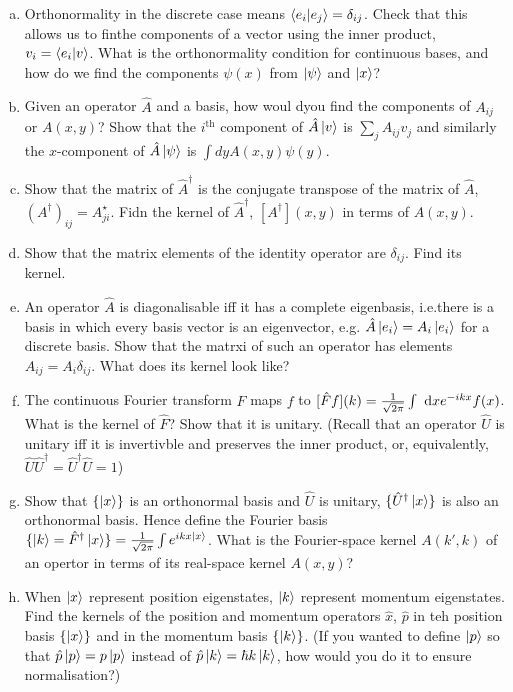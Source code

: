 \documentclass[10pt]{article}
\begin{document}
    \begin{enumerate}[(a)]
        \item Orthonormality in the discrete case means $\braket{e_i}{e_j} = \delta_{ij}$. Check that this allows us to finthe components of a vector using the inner product, $v_i = \braket{e_i}{v}$. What is the orthonormality condition for continuous bases, and how do we find the components $\psi(x)$ from $\ket \psi$ and $\ket x$?
        \item Given an operator $\hat A$ and a basis, how woul dyou find the components of $A_{ij}$ or $A(x, y)$? Show that the $i^{\text{th}}$ component of $\hat A \ket v$ is $\sum_j A_{ij}v_j$ and similarly the $x$-component of $\hat A \ket\psi$ is $\int dy A(x, y) \psi(y)$.
        \item Show that the matrix of $\hat A^\dagger$ is the conjugate transpose of the matrix of $\hat A$, $(A^\dagger)_{ij} = A^\star_{ji}$. Fidn the kernel of $\hat A^\dagger$, $[A^\dagger](x, y)$ in terms of $A(x, y)$.
        \item Show that the matrix elements of the identity operator are $\delta_{ij}$. Find its kernel.
        \item An operator $\hat A$ is diagonalisable iff it has a complete eigenbasis, i.e.there is a basis in which every basis vector is an eigenvector, e.g. $\hat A \ket{e_i} = A_i \ket{e_i}$ for a discrete basis. Show that the matrxi of such an operator has elements $A_{ij} = A_i\delta_{ij}$. What does its kernel look like? 
        \item The continuous Fourier transform $\hat F$ maps $f$ to $[\hat F f](k) = \frac{1}{\sqrt{2\pi}} \int \ \dd x e^{-ikx} f(x)$. What is the kernel of $\hat F$? Show that it is unitary. (Recall that an operator $\hat U$ is unitary iff it is invertivble and preserves the inner product, or, equivalently, $\hat U \hat U^\dagger = \hat U^\dagger \hat U = 1$)
        \item Show that $\{\ket x\}$ is an orthonormal basis and $\hat U$ is unitary, $\{\hat U^\dagger \ket x\}$ is also an orthonormal basis. Hence define the Fourier basis $\{\ket k = \hat F^\dagger \ket x\} = \frac{1}{\sqrt{2\pi}} \int e^{ikx \ket x}$. What is the Fourier-space kernel $A(k', k)$ of an opertor in terms of its real-space kernel $A(x, y)$?
        \item When $\ket x$ represent position eigenstates, $\ket k$ represent momentum eigenstates. Find the kernels of the position and momentum operators $\hat x$, $\hat p$ in teh position basis $\{ \ket x\}$ and in the momentum basis $\{\ket k\}$. (If you wanted to define $\ket p$ so that $\hat p \ket p = p \ket p$ instead of $\hat p \ket k = \hbar k \ket k$, how would you do it to ensure normalisation?)

\end{enumerate}
\end{document}
